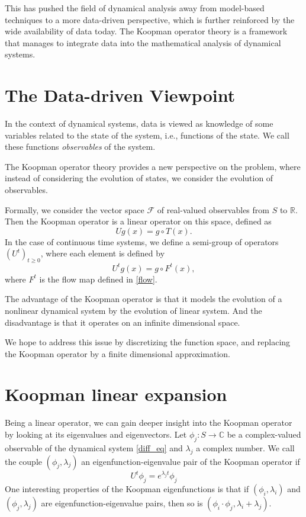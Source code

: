 \documentclass{article}
\def\R{\mathbb{R}}
\def\C{\mathbb{C}}
\begin{document}
This has pushed the field of dynamical analysis away from model-based
techniques to a more data-driven perspective, which is further reinforced by
the wide availability of data today.
The Koopman operator theory is a framework that manages to integrate data into
the mathematical analysis of dynamical systems.

\section{The Data-driven Viewpoint}%
\label{sec:the_data_driven_viewpoint}

In the context of dynamical systems, data is viewed as knowledge of some
variables related to the state of the system, i.e., functions of the state.
We call these functions \textit{observables} of the system.

The Koopman operator theory provides a new perspective on the problem, where
instead of considering the evolution of states, we consider the evolution
of observables.

Formally, we consider the vector space $\mathcal{F}$ of real-valued observables
from $S$ to $\R$.
Then the Koopman operator is a linear operator on this space, defined as
\begin{equation}
    U g(x) = g\circ T(x).
\end{equation}
In the case of continuous time systems, we define a semi-group of operators
$(U^t)_{t \geq 0}$, where each element is defined by
\begin{equation}
    U^t g (x) = g\circ F^t(x),
\end{equation}
where $F^t$ is the flow map defined in \eqref{flow}.

The advantage of the Koopman operator is that it models the evolution of a
nonlinear dynamical system by the evolution of linear system.
And the disadvantage is that it operates on an infinite dimensional space.

We hope to address this issue by discretizing the function space, and replacing
the Koopman operator by a finite dimensional approximation.

\section{Koopman linear expansion}%
\label{sec:koopman_linear_expansion}

Being a linear operator, we can gain deeper insight into the Koopman operator
by looking at its eigenvalues and eigenvectors.
Let $\phi_j:S\to \C$ be a complex-valued observable of the dynamical system
\eqref{diff_eq} and $\lambda_j$ a complex number.
We call the couple $(\phi_j, \lambda_j)$ an eigenfunction-eigenvalue pair of
the Koopman operator if
\begin{equation}
    \label{eig}
    U^t\phi_j = e^{\lambda_j t} \phi_j
\end{equation}
One interesting properties of the Koopman eigenfunctions is that if
$(\phi_i, \lambda_i)$ and $(\phi_j, \lambda_j)$ are eigenfunction-eigenvalue
pairs, then so is $(\phi_i \cdot \phi_j, \lambda_i + \lambda_j)$.
\end{document}
